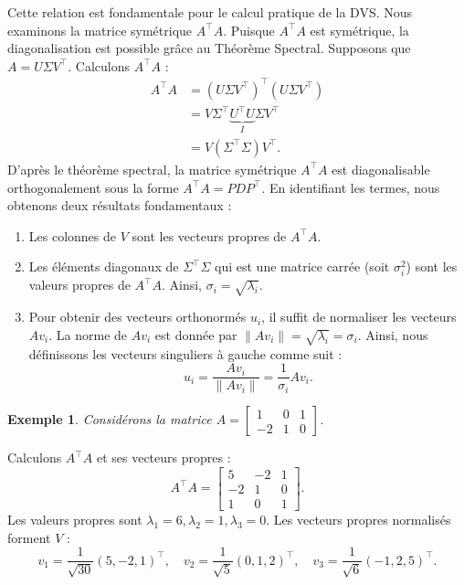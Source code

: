 \documentclass[12pt]{report}
\newtheorem{example}{Exemple}
\begin{document}
\noindent Cette relation est fondamentale pour le calcul pratique de la DVS. Nous examinons la matrice symétrique $A^\top A$. Puisque $A^\top A$ est symétrique, la diagonalisation est possible grâce au Théorème Spectral. Supposons que $A = U \Sigma V^\top$. Calculons $A^\top A$ :
\begin{align*}
    A^\top A & = (U \Sigma V^\top)^\top (U \Sigma V^\top)              \\
             & = V \Sigma^\top \underbrace{U^\top U}_{I} \Sigma V^\top \\
             & = V (\Sigma^\top \Sigma) V^\top.
\end{align*}
D'après le théorème spectral, la matrice symétrique $A^\top A$ est diagonalisable orthogonalement sous la forme $A^\top A = P D P^\top$.
En identifiant les termes, nous obtenons deux résultats fondamentaux :
\begin{enumerate}
    \item Les colonnes de $V$ sont les {vecteurs propres} de $A^\top A$.
    \item Les éléments diagonaux de $\Sigma^\top \Sigma$ qui est une matrice carrée (soit $\sigma_i^2$) sont les {valeurs propres} de $A^\top A$. Ainsi, $\sigma_i = \sqrt{\lambda_i}$.
    \item Pour obtenir des vecteurs orthonormés $u_i$, il suffit de normaliser les vecteurs $Av_i$. La norme de $Av_i$ est donnée par $\|Av_i\| = \sqrt{\lambda_i} = \sigma_i$. Ainsi, nous définissons les vecteurs singuliers à gauche comme suit :
          \[
              u_i = \frac{Av_i}{\|Av_i\|} = \frac{1}{\sigma_i} A v_i.
          \]
\end{enumerate}

\clearpage
\begin{example}
    Considérons la matrice $A = \begin{bmatrix} 1 & 0 & 1 \\ -2 & 1 & 0 \end{bmatrix}$.
\end{example}

\noindent Calculons $A^\top A$ et ses vecteurs propres :
\[
    A^\top A = \begin{bmatrix} 5 & -2 & 1 \\ -2 & 1 & 0 \\ 1 & 0 & 1 \end{bmatrix}.
\]
Les valeurs propres sont $\lambda_1=6, \lambda_2=1, \lambda_3=0$. Les vecteurs propres normalisés forment $V$ :
\[
    v_1 = \frac{1}{\sqrt{30}}(5, -2, 1)^\top, \quad v_2 = \frac{1}{\sqrt{5}}(0, 1, 2)^\top, \quad v_3 = \frac{1}{\sqrt{6}}(-1, 2, 5)^\top.
\]
\end{document}

